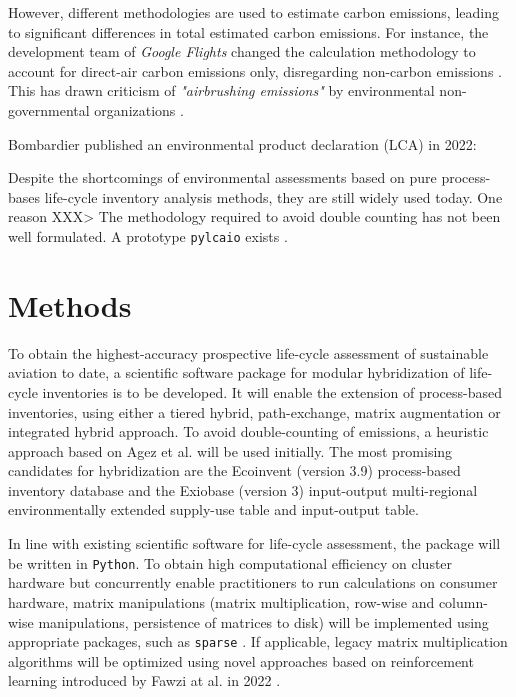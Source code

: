 \documentclass{article}
\begin{document}
    However, different methodologies are used to estimate carbon emissions, leading to significant differences in total estimated carbon emissions. For instance, the development team of \textit{Google Flights} changed the calculation methodology to account for direct-air carbon emissions only, disregarding non-carbon emissions \cite{ali_commit_2022}. This has drawn criticism of \textit{"airbrushing emissions"} by environmental non-governmental organizations \cite{hern_google_2022}\cite{rowlatt_google_2022}.
    
    Bombardier published an environmental product declaration (LCA) in 2022: \cite{noauthor_challenger_2022}
    
    
        Despite the shortcomings of environmental assessments based on pure process-bases life-cycle inventory analysis methods, they are still widely used today. One reason XXX> The methodology required to avoid double counting has not been well formulated. A prototype \texttt{pylcaio}\cite{noauthor_pylcaio_2022} exists .
    
\section{Methods}

    To obtain the highest-accuracy prospective life-cycle assessment of sustainable aviation to date, a scientific software package for modular hybridization of life-cycle inventories is to be developed. It will enable the extension of process-based inventories, using either a tiered hybrid, path-exchange, matrix augmentation or integrated hybrid \cite{hauschild_life_2015}\cite{hauschild_life_2018}\cite{crawford_hybrid_2018} approach. To avoid double-counting of emissions, a heuristic approach based on Agez et al. \cite{agez_lifting_2019}\cite{agez_correcting_2022}\cite{agez_hybridization_2020} will be used initially. The most promising candidates for hybridization are the Ecoinvent (version 3.9) process-based inventory database and the Exiobase (version 3) input-output multi-regional environmentally extended supply-use  table and input-output table.
    
    In line with existing scientific software for life-cycle assessment, the package will be written in \texttt{Python}. To obtain high computational efficiency on cluster hardware but concurrently enable practitioners to run calculations on consumer hardware, matrix manipulations (matrix multiplication, row-wise and column-wise manipulations, persistence of matrices to disk) will be implemented using appropriate packages, such as \texttt{sparse} \cite{abbasi_sparse_2018}. If applicable, legacy matrix multiplication algorithms will be optimized using novel approaches based on reinforcement learning introduced by Fawzi at al. in 2022 \cite{fawzi_discovering_2022}.
    
\end{document}
